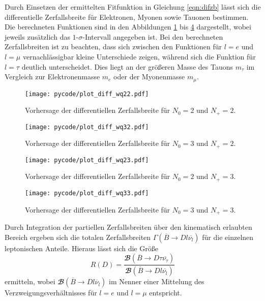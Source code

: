 Durch Einsetzen der ermittelten Fitfunktion in Gleichung \eqref{eqn:difzb} lässt sich die differentielle Zerfallsbreite für Elektronen, Myonen sowie Tauonen bestimmen.
Die berechneten Funktionen sind in den Abbildungen \ref{fig:difwq22} bis \ref{fig:difwq33} dargestellt, wobei jeweils zusätzlich das $\num{1}$-$\sigma$-Intervall angegeben ist.
Bei den berechneten Zerfallsbreiten ist zu beachten, dass sich zwischen den Funktionen für $l = e$ und $l = \mu$ vernachlässigbar kleine Unterschiede zeigen, während sich die Funktion für $l = \tau$ deutlich unterscheidet.
Dies liegt an der größeren Masse des Tauons $m_{\tau}$ im Vergleich zur Elektronenmasse $m_{e}$ oder der Myonenmasse $m_{\mu}$.
\begin{figure}
  \centering
  \texttt{[image: pycode/plot\_diff\_wq22.pdf]}
  \caption{Vorhersage der differentiellen Zerfallsbreite für $N_0 = \num{2}$ und $N_+ = \num{2}$.}
  \label{fig:difwq22}
\end{figure}
\begin{figure}
  \centering
  \texttt{[image: pycode/plot\_diff\_wq32.pdf]}
  \caption{Vorhersage der differentiellen Zerfallsbreite für $N_0 = \num{3}$ und $N_+ = \num{2}$.}
  \label{fig:difwq32}
\end{figure}
\begin{figure}
  \centering
  \texttt{[image: pycode/plot\_diff\_wq23.pdf]}
  \caption{Vorhersage der differentiellen Zerfallsbreite für $N_0 = \num{2}$ und $N_+ = \num{3}$.}
  \label{fig:difwq23}
\end{figure}
\begin{figure}
  \centering
  \texttt{[image: pycode/plot\_diff\_wq33.pdf]}
  \caption{Vorhersage der differentiellen Zerfallsbreite für $N_0 = \num{3}$ und $N_+ = \num{3}$.}
  \label{fig:difwq33}
\end{figure}
Durch Integration der partiellen Zerfallsbreiten über den kinematisch erlaubten Bereich ergeben sich die totalen Zerfallsbreiten $\Gamma \left(\overline{B} \to D l \overline{\nu_l} \right)$ für die einzelnen leptonischen Anteile. \nocite{scipy}
Hieraus lässt sich die Größe
\begin{equation}
  \label{eqn:R}
  R(D) = \frac{{\mathbfcal{B}}\!\left(\overline{B} \to D \tau \overline{\nu_\tau} \right)}{{\mathbfcal{B}}\!\left(\overline{B} \to D l \overline{\nu_l} \right)}
\end{equation}
ermitteln, wobei ${\mathbfcal{B}} \!\left(\overline{B} \to D l \overline{\nu}_l \right)$ im Nenner einer Mittelung des Verzweigungsverhältnisses für $l = e$ und $l = \mu$ entspricht.
